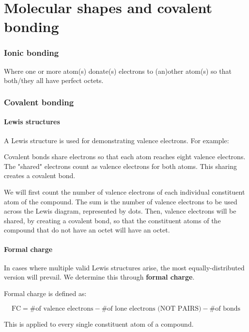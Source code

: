 \documentclass[letterpaper, 12pt]{article}
\begin{document}
\clearpage

\part{Molecular shapes and covalent bonding}

\section{Ionic bonding}
Where one or more atom(s) donate(s) electrons to (an)other atom(s) so that both/they all have perfect octets.

\section{Covalent bonding}

	\subsection{Lewis structures}
	A Lewis structure is used for demonstrating valence electrons. For example:


	Covalent bonds share electrons so that each atom reaches eight valence electrons. The "shared" electrons count as valence electrons for both atoms. This sharing creates a covalent bond.

	We will first count the number of valence electrons of each individual constituent atom of the compound. The sum is the number of valence electrons to be used across the Lewis diagram, represented by dots. Then, valence electrons will be shared, by creating a covalent bond, so that the constituent atoms of the compound that do not have an octet will have an octet.

	\subsection{Formal charge}
	In cases where multiple valid Lewis structures arise, the most equally-distributed version will prevail. We determine this through \textbf{formal charge}.

	Formal charge is defined as:

	$$\text{FC} = \text{\# of valence electrons} - \text{\# of lone electrons (NOT PAIRS)} - \text{\# of bonds}$$

	This is applied to every single constituent atom of a compound.
\end{document}
